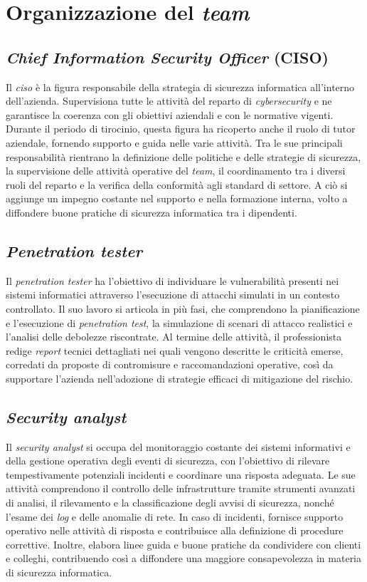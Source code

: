 \section{Organizzazione del \textit{team}}  

\subsection{\textit{Chief Information Security Officer} (CISO)}  
Il \textit{\gls{ciso}} è la figura responsabile della strategia di sicurezza informatica all'interno dell'azienda.
Supervisiona tutte le attività del reparto di \textit{cybersecurity} e ne garantisce la coerenza con gli obiettivi aziendali e con le normative vigenti.
Durante il periodo di tirocinio, questa figura ha ricoperto anche il ruolo di tutor aziendale, fornendo supporto e guida nelle varie attività.
Tra le sue principali responsabilità rientrano la definizione delle politiche e delle strategie di sicurezza, la supervisione delle attività operative del \textit{team}, il coordinamento tra i diversi ruoli del reparto e la verifica della conformità agli standard di settore.
A ciò si aggiunge un impegno costante nel supporto e nella formazione interna, volto a diffondere buone pratiche di sicurezza informatica tra i dipendenti.  

\subsection{\textit{Penetration tester}}  
Il \textit{penetration tester} ha l'obiettivo di individuare le vulnerabilità presenti nei sistemi informatici attraverso l'esecuzione di attacchi simulati in un contesto controllato.
Il suo lavoro si articola in più fasi, che comprendono la pianificazione e l'esecuzione di \textit{penetration test}, la simulazione di scenari di attacco realistici e l'analisi delle debolezze riscontrate.
Al termine delle attività, il professionista redige \textit{report} tecnici dettagliati nei quali vengono descritte le criticità emerse, corredati da proposte di contromisure e raccomandazioni operative, così da supportare l'azienda nell'adozione di strategie efficaci di mitigazione del rischio.  

\subsection{\textit{Security analyst}}  
Il \textit{security analyst} si occupa del monitoraggio costante dei sistemi informativi e della gestione operativa degli eventi di sicurezza, con l'obiettivo di rilevare tempestivamente potenziali incidenti e coordinare una risposta adeguata.
Le sue attività comprendono il controllo delle infrastrutture tramite strumenti avanzati di analisi, il rilevamento e la classificazione degli avvisi di sicurezza, nonché l'esame dei \textit{log} e delle anomalie di rete.
In caso di incidenti, fornisce supporto operativo nelle attività di risposta e contribuisce alla definizione di procedure correttive.
Inoltre, elabora linee guida e buone pratiche da condividere con clienti e colleghi, contribuendo così a diffondere una maggiore consapevolezza in materia di sicurezza informatica.  
